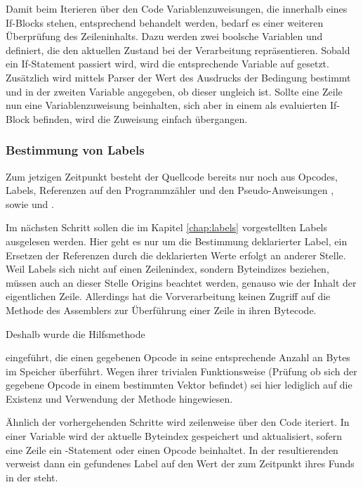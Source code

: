 Damit beim Iterieren über den Code Variablenzuweisungen, die innerhalb eines If-Blocks stehen, entsprechend behandelt werden, bedarf es einer weiteren Überprüfung des Zeileninhalts. Dazu werden zwei boolsche Variablen  und  definiert, die den aktuellen Zustand bei der Verarbeitung repräsentieren. Sobald ein If-Statement passiert wird, wird die entsprechende Variable auf  gesetzt. Zusätzlich wird mittels Parser der Wert des Ausdrucks der Bedingung bestimmt und in der zweiten Variable angegeben, ob dieser ungleich \grqq{} ist. Sollte eine Zeile nun eine Variablenzuweisung beinhalten, sich aber in einem als  evaluierten If-Block befinden, wird die Zuweisung einfach übergangen.

\subsubsection{Bestimmung von Labels}

Zum jetzigen Zeitpunkt besteht der Quellcode bereits nur noch aus Opcodes, Labels, Referenzen auf den Programmzähler und den Pseudo-Anweisungen , sowie  und .

Im nächsten Schritt sollen die im Kapitel \ref{chap:labels} vorgestellten Labels ausgelesen werden. Hier geht es nur um die Bestimmung deklarierter Label, ein Ersetzen der Referenzen durch die deklarierten Werte erfolgt an anderer Stelle. Weil Labels sich nicht auf einen Zeilenindex, sondern Byteindizes beziehen, müssen auch an dieser Stelle Origins beachtet werden, genauso wie der Inhalt der eigentlichen Zeile. Allerdings hat die Vorverarbeitung keinen Zugriff auf die Methode  des Assemblers zur Überführung einer Zeile in ihren Bytecode. 

Deshalb wurde die Hilfsmethode

\qquad{} 

eingeführt, die einen gegebenen Opcode in seine entsprechende Anzahl an Bytes im Speicher überführt. Wegen ihrer trivialen Funktionsweise (Prüfung ob sich der gegebene Opcode in einem bestimmten Vektor befindet) sei hier lediglich auf die Existenz und Verwendung der Methode hingewiesen. 

Ähnlich der vorhergehenden Schritte wird zeilenweise über den Code iteriert. In einer Variable  wird der aktuelle Byteindex gespeichert und aktualisiert, sofern eine Zeile ein -Statement oder einen Opcode beinhaltet. In der resultierenden  verweist dann ein gefundenes Label auf den Wert der zum Zeitpunkt ihres Funds in der  steht.

